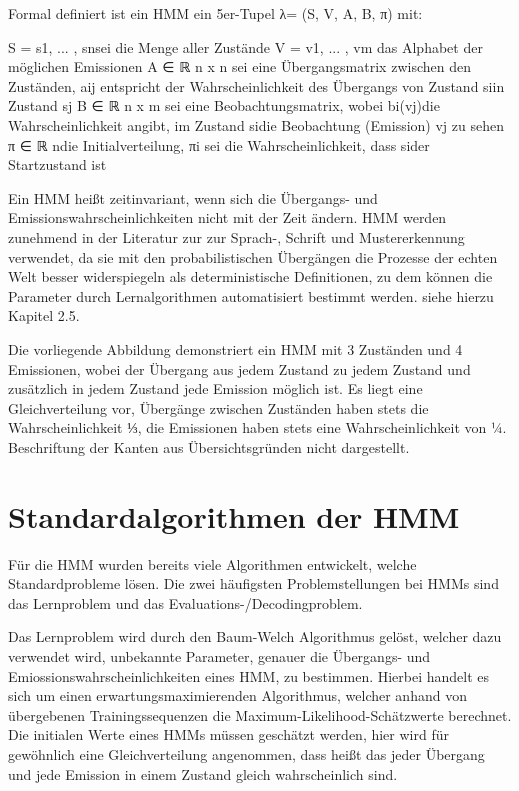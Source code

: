 Formal definiert ist ein HMM ein 5er-Tupel λ= (S, V, A, B, π) mit:

S = {s1, ... , sn}sei die Menge aller Zustände
V = {v1, ... , vm} das Alphabet der möglichen Emissionen
A ∈ ℝ n x n sei eine Übergangsmatrix zwischen den Zuständen, aij entspricht der Wahrscheinlichkeit des Übergangs von Zustand siin Zustand sj
B ∈ ℝ n x m sei eine Beobachtungsmatrix, wobei bi(vj)die Wahrscheinlichkeit angibt, im Zustand sidie Beobachtung (Emission) vj zu sehen
π ∈ ℝ ndie Initialverteilung, πi sei die Wahrscheinlichkeit, dass sider Startzustand ist

Ein HMM heißt zeitinvariant, wenn sich die Übergangs- und Emissionswahrscheinlichkeiten nicht mit der Zeit ändern.
HMM werden zunehmend in der Literatur zur zur Sprach-, Schrift und Mustererkennung verwendet, da sie mit den probabilistischen Übergängen die Prozesse der echten Welt besser widerspiegeln als deterministische Definitionen, zu dem können die Parameter durch Lernalgorithmen automatisiert bestimmt werden. siehe hierzu Kapitel 2.5.


Die vorliegende Abbildung demonstriert ein HMM mit 3 Zuständen und 4 Emissionen, wobei der Übergang aus jedem Zustand zu jedem Zustand und zusätzlich in jedem Zustand jede Emission möglich ist. Es liegt eine Gleichverteilung vor, Übergänge zwischen Zuständen haben stets die Wahrscheinlichkeit ⅓, die Emissionen haben stets eine Wahrscheinlichkeit von ¼. Beschriftung der Kanten aus Übersichtsgründen nicht dargestellt.

\section{Standardalgorithmen der HMM}

Für die HMM wurden bereits viele Algorithmen entwickelt, welche Standardprobleme lösen. Die zwei häufigsten Problemstellungen bei HMMs sind das Lernproblem und das Evaluations-/Decodingproblem.

Das Lernproblem wird durch den Baum-Welch Algorithmus gelöst, welcher dazu verwendet wird, unbekannte Parameter, genauer die Übergangs- und Emiossionswahrscheinlichkeiten eines HMM, zu bestimmen. Hierbei handelt es sich um einen erwartungsmaximierenden Algorithmus, welcher anhand von übergebenen Trainingssequenzen die Maximum-Likelihood-Schätzwerte berechnet. Die initialen Werte eines HMMs müssen geschätzt werden, hier wird für gewöhnlich eine Gleichverteilung angenommen, dass heißt das jeder Übergang und jede Emission in einem Zustand gleich wahrscheinlich sind.

